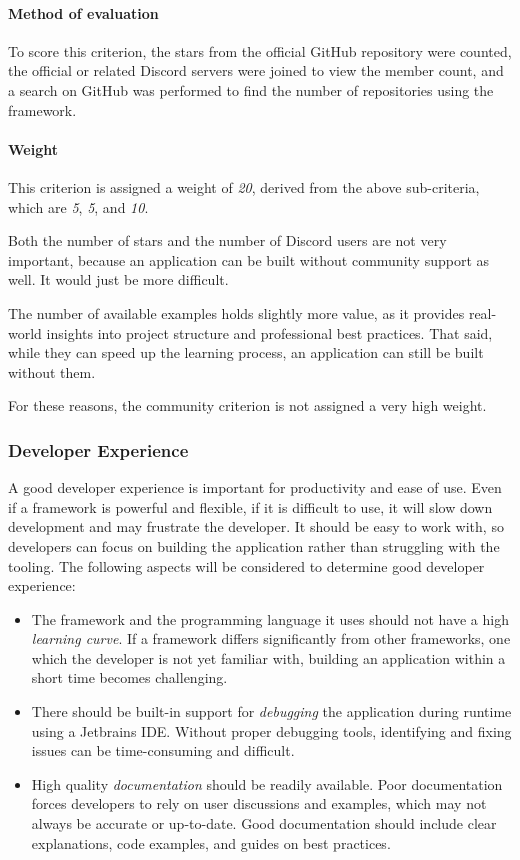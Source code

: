 \paragraph{Method of evaluation}
To score this criterion, the stars from the official GitHub repository were counted, the official or related Discord servers were joined to view the member count, and a search on GitHub was performed to find the number of repositories using the framework.

\paragraph{Weight}
This criterion is assigned a weight of \emph{20}, derived from the above sub-criteria, which are \emph{5}, \emph{5}, and \emph{10}.

Both the number of stars and the number of Discord users are not very important, because an application can be built without community support as well.
It would just be more difficult.

The number of available examples holds slightly more value, as it provides real-world insights into project structure and professional best practices.
That said, while they can speed up the learning process, an application can still be built without them.

For these reasons, the community criterion is not assigned a very high weight.

\subsubsection{Developer Experience}\label{subsubsec:developer-experience}
A good developer experience is important for productivity and ease of use.
Even if a framework is powerful and flexible, if it is difficult to use, it will slow down development and may frustrate the developer.
It should be easy to work with, so developers can focus on building the application rather than struggling with the tooling.
The following aspects will be considered to determine good developer experience:

\begin{itemize}
	\item The framework and the programming language it uses should not have a high \emph{learning curve}.
	      If a framework differs significantly from other frameworks, one which the developer is not yet familiar with, building an application within a short time becomes challenging.
	\item There should be built-in support for \emph{debugging} the application during runtime using a Jetbrains IDE.
	      Without proper debugging tools, identifying and fixing issues can be time-consuming and difficult.
	\item High quality \emph{documentation} should be readily available.
	      Poor documentation forces developers to rely on user discussions and examples, which may not always be accurate or up-to-date.
	      Good documentation should include clear explanations, code examples, and guides on best practices.
\end{itemize}

